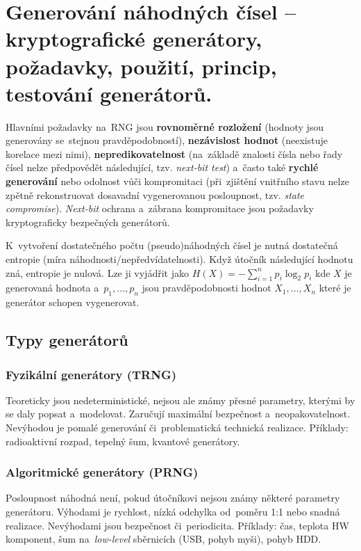 \clearpage
\section{Generování náhodných čísel -- kryptografické generátory, požadavky, použití, princip, testování generátorů.}

Hlavními požadavky na~RNG jsou \textbf{rovnoměrné rozložení} (hodnoty jsou generovány se~stejnou pravděpodobností), \textbf{nezávislost hodnot} (neexistuje korelace mezi nimi), \textbf{nepredikovatelnost} (na~základě znalosti čísla nebo řady čísel nelze předpovědět následující, tzv. \emph{next-bit test}) a~často také \textbf{rychlé generování} nebo odolnost vůči kompromitaci (při~zjištění vnitřního stavu nelze zpětně rekonstruovat dosavadní vygenerovanou posloupnost, tzv. \emph{state compromise}). \emph{Next-bit} ochrana a~zábrana kompromitace jsou požadavky kryptograficky bezpečných generátorů.

K~vytvoření dostatečného počtu (pseudo)náhodných čísel je nutná dostatečná entropie (míra náhodnosti/nepředvídatelnosti). Když útočník následující hodnotu zná, entropie je nulová. Lze ji vyjádřit jako $H(X) = - \sum_{i=1}^{n} p_i \log_2 p_i$ kde $X$ je generovaná hodnota a~$p_1, \dots, p_n$ jsou pravděpodobnosti hodnot $X_1, \dots, X_n$ které je generátor schopen vygenerovat.

\subsection{Typy generátorů}

\subsubsection*{Fyzikální generátory (TRNG)}

Teoreticky jsou nedeterministické, nejsou ale známy přesné parametry, kterými by se daly popsat a~modelovat. Zaručují maximální bezpečnost a~neopakovatelnost. Nevýhodou je pomalé generování či~problematická technická realizace. Příklady: radioaktivní rozpad, tepelný šum, kvantové generátory.

\subsubsection*{Algoritmické generátory (PRNG)}

Posloupnost náhodná není, pokud útočníkovi nejsou známy některé parametry generátoru. Výhodami je rychlost, nízká odchylka od~poměru 1:1 nebo snadná realizace. Nevýhodami jsou bezpečnost či~periodicita. Příklady: čas, teplota HW komponent, šum na~\emph{low-level} sběrnicích (USB, pohyb myši), pohyb HDD.

